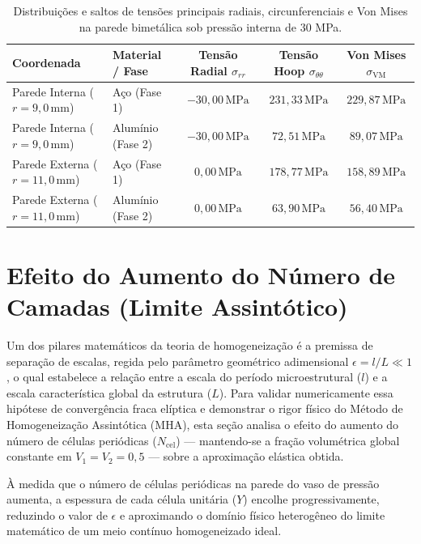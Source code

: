 \begin{table}[htbp]
  \centering
  \caption{Distribuições e saltos de tensões principais radiais, circunferenciais e Von Mises na parede bimetálica sob pressão interna de 30 MPa.}
  \label{tab:tensoes_r_int_r_ext}
  \begin{tabular}{l l c c c}
    \hline
    \textbf{Coordenada} & \textbf{Material / Fase} & \textbf{Tensão Radial $\sigma_{rr}$} & \textbf{Tensão Hoop $\sigma_{\theta\theta}$} & \textbf{Von Mises $\sigma_{\text{VM}}$} \\ \hline
    Parede Interna ($r=9,0 \, \text{mm}$) & Aço (Fase 1) & $-30,00 \, \text{MPa}$ & $231,33 \, \text{MPa}$ & $229,87 \, \text{MPa}$ \\ \hline
    Parede Interna ($r=9,0 \, \text{mm}$) & Alumínio (Fase 2) & $-30,00 \, \text{MPa}$ & $72,51 \, \text{MPa}$ & $89,07 \, \text{MPa}$ \\ \hline
    Parede Externa ($r=11,0 \, \text{mm}$) & Aço (Fase 1) & $0,00 \, \text{MPa}$ & $178,77 \, \text{MPa}$ & $158,89 \, \text{MPa}$ \\ \hline
    Parede Externa ($r=11,0 \, \text{mm}$) & Alumínio (Fase 2) & $0,00 \, \text{MPa}$ & $63,90 \, \text{MPa}$ & $56,40 \, \text{MPa}$ \\ \hline
  \end{tabular}
\end{table}

\section{Efeito do Aumento do Número de Camadas (Limite Assintótico)}\label{sec:limite_assintotico}

Um dos pilares matemáticos da teoria de homogeneização é a premissa de separação de escalas, regida pelo parâmetro geométrico adimensional $\epsilon = l/L \ll 1$, o qual estabelece a relação entre a escala do período microestrutural ($l$) e a escala característica global da estrutura ($L$). Para validar numericamente essa hipótese de convergência fraca elíptica e demonstrar o rigor físico do Método de Homogeneização Assintótica (MHA), esta seção analisa o efeito do aumento do número de células periódicas ($N_{\text{cel}}$) — mantendo-se a fração volumétrica global constante em $V_1 = V_2 = 0,5$ — sobre a aproximação elástica obtida.

À medida que o número de células periódicas na parede do vaso de pressão aumenta, a espessura de cada célula unitária ($Y$) encolhe progressivamente, reduzindo o valor de $\epsilon$ e aproximando o domínio físico heterogêneo do limite matemático de um meio contínuo homogeneizado ideal.

